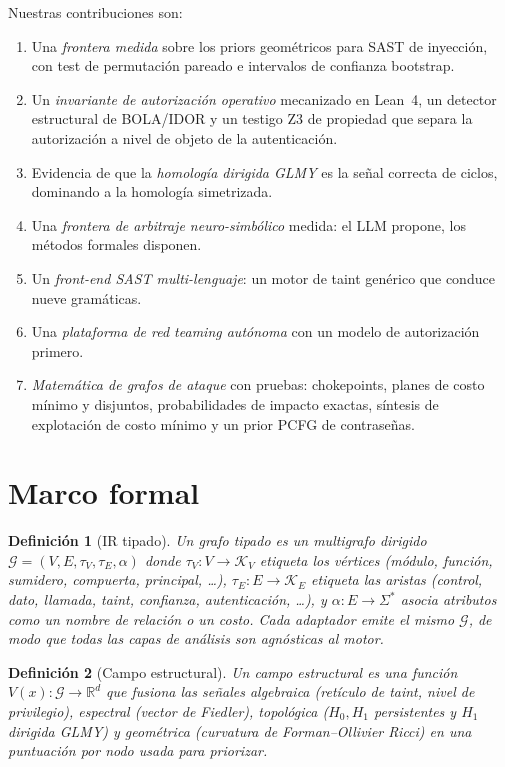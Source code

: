 \documentclass[journal]{IEEEtran}
\newcommand{\R}{\mathbb{R}}
\newcommand{\IR}{\mathcal{G}}
\newtheorem{definition}{Definición}
\begin{document}
Nuestras contribuciones son:
\begin{enumerate}[label=\textbf{C\arabic*.},leftmargin=2.2em]
\item Una \emph{frontera medida} sobre los priors geométricos para SAST de
  inyección, con test de permutación pareado e intervalos de confianza bootstrap.
\item Un \emph{invariante de autorización operativo} mecanizado en Lean~4, un
  detector estructural de BOLA/IDOR y un testigo Z3 de propiedad que separa la
  autorización a nivel de objeto de la autenticación.
\item Evidencia de que la \emph{homología dirigida GLMY} es la señal correcta de
  ciclos, dominando a la homología simetrizada.
\item Una \emph{frontera de arbitraje neuro-simbólico} medida: el LLM propone, los
  métodos formales disponen.
\item Un \emph{front-end SAST multi-lenguaje}: un motor de taint genérico que
  conduce nueve gramáticas.
\item Una \emph{plataforma de red teaming autónoma} con un modelo de autorización
  primero.
\item \emph{Matemática de grafos de ataque} con pruebas: chokepoints, planes de
  costo mínimo y disjuntos, probabilidades de impacto exactas, síntesis de
  explotación de costo mínimo y un prior PCFG de contraseñas.
\end{enumerate}

\section{Marco formal}
\label{sec:framework}

\begin{definition}[IR tipado]
\label{def:ir}
Un \emph{grafo tipado} es un multigrafo dirigido
$\IR=(V,E,\tau_V,\tau_E,\alpha)$ donde $\tau_V:V\to\mathcal{K}_V$ etiqueta los
vértices (módulo, función, sumidero, compuerta, principal, \dots),
$\tau_E:E\to\mathcal{K}_E$ etiqueta las aristas (control, dato, llamada, taint,
confianza, autenticación, \dots), y $\alpha:E\to\Sigma^{*}$ asocia atributos como
un nombre de relación o un costo. Cada adaptador emite el mismo $\IR$, de modo que
todas las capas de análisis son agnósticas al motor.
\end{definition}

\begin{definition}[Campo estructural]
\label{def:field}
Un \emph{campo estructural} es una función $V(x):\IR\to\R^{d}$ que fusiona las
señales algebraica (retículo de taint, nivel de privilegio), espectral (vector de
Fiedler), topológica ($H_0,H_1$ persistentes y $H_1$ dirigida GLMY) y geométrica
(curvatura de Forman--Ollivier Ricci) en una puntuación por nodo usada para
priorizar.
\end{definition}
\end{document}
